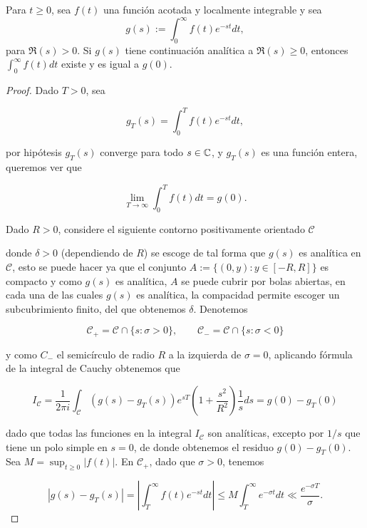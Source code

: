\begin{theorem}
    Para $t \geq 0$, sea $f(t)$ una función acotada y localmente integrable y sea $$g(s):=\displaystyle\int_0^{\infty} f(t) e^{-s t} d t,$$
     para $\Re(s)>0$. Si $g(s)$ tiene continuación analítica a $\Re(s) \geq 0$, entonces $\displaystyle\int_0^{\infty} f(t) d t$ existe y es igual a $g(0)$.
\end{theorem}

\begin{proof}
    Dado $T>0$, sea

    $$g_T(s)=\int_0^Tf(t)e^{-st}dt,$$

    por hipótesis $g_T(s)$ converge para todo $s\in \mathbb{C}$, y $g_T(s)$ es una función entera, queremos ver que 

    $$\lim_{T \to \infty} \int_0^T f(t)dt=g(0).$$
 
    Dado $R>0$, considere el siguiente contorno positivamente orientado $\mathscr{C}$

    \begin{center}
    
    \end{center}

    donde $\delta>0$ (dependiendo de $R$) se escoge de tal forma que $g(s)$ es analítica en $\mathscr{C}$, esto se puede hacer ya que el conjunto $A:=\{(0,y): y\in [-R,R]\}$ es compacto y como $g(s)$ es analítica, $A$ se puede cubrir por bolas abiertas, en cada una de las cuales $g(s)$ es analítica, la compacidad permite escoger un subcubrimiento finito, del que obtenemos $\delta$.  Denotemos

    $$\mathscr{C}_+=\mathscr{C}\cap \{s:\sigma>0\},\quad \quad \mathscr{C}_-=\mathscr{C}\cap \{s:\sigma<0\}$$

    y como $C_-$ el semicírculo de radio $R$ a la izquierda de $\sigma=0$, aplicando fórmula de la integral de Cauchy obtenemos que

    $$I_{\mathscr{C}}=\frac{1}{2\pi i}\int_{\mathscr{C}}\left(g(s)-g_T(s)\right)e^{sT}\left(1+\frac{s^2}{R^2}\right)\frac{1}{s}ds=g(0)-g_T(0)$$

    dado que todas las funciones en la integral $I_{\mathscr{C}}$ son analíticas, excepto por $1/s$ que tiene un polo simple en $s=0$, de donde obtenemos el residuo $g(0)-g_T(0)$.\\

    Sea $M = \sup _{t \geq 0}|f(t)|$. En $\mathscr{C}_{+}$, dado que $\sigma > 0$, tenemos

\[
\left|g(s)-g_T(s)\right| = \left|\int_T^{\infty} f(t) e^{-s t} d t\right| \leq M \int_T^{\infty} e^{-\sigma t} d t \ll \frac{e^{-\sigma T}}{\sigma}.
\]


\end{proof}
